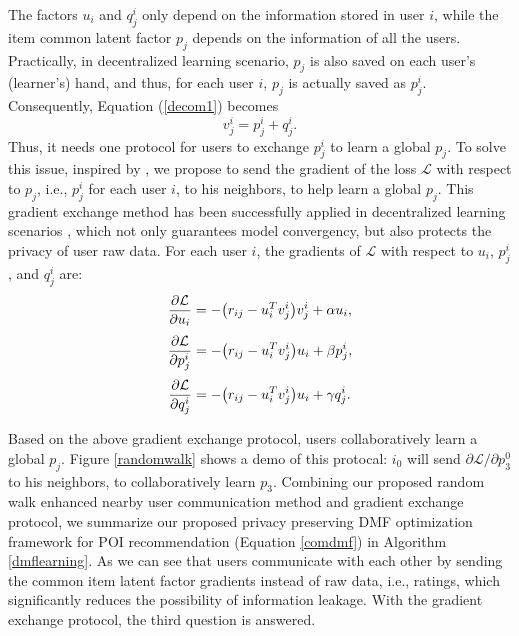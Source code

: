 The factors $u_i$ and $q^i_j$ only depend on the information stored in user $i$, while the item common latent factor $p_j$ depends on the information of all the users.
Practically, in decentralized learning scenario, $p_j$ is also saved on each user's (learner's) hand, and thus, for each user $i$, $p_j$ is actually saved as $p^i_j$. Consequently, Equation (\ref{decom1}) becomes 
\begin{equation}\label{decom2}
v^i_j=p^i_j+q^i_j.
\end{equation} 
Thus, it needs one protocol for users to exchange $p^i_j$ to learn a global $p_j$. 
To solve this issue, inspired by \cite{yan2013distributed}, we propose to send the gradient of the loss $\mathcal{L}$ with respect to $p_j$, i.e., $p^i_j$ for each user $i$, to his neighbors, to help learn a global $p_j$.  
This gradient exchange method has been successfully applied in decentralized learning scenarios \cite{nedic2009distributed,yan2013distributed}, which not only guarantees model convergency, but also protects the privacy of user raw data.  
For each user $i$, the gradients of $\mathcal{L}$ with respect to $u_i$, $p^i_j$, and $q^i_j$ are:
\begin{equation}\small
\label{usergradient}
\frac{\partial \mathcal{L}}{\partial u_i} = -{\left(r_{ij} - u_i^T v^i_j\right)}v^i_j + \alpha u_{i},
\end{equation} 
\begin{equation}\small
\label{commonitemgradient}
\frac{\partial \mathcal{L}}{\partial p^i_j} = -{\left(r_{ij} - u_i^T v^i_j\right)}u_i + \beta p^i_j,
\end{equation} 
\begin{equation}\small
\label{personalitemgradient}
\frac{\partial \mathcal{L}}{\partial q^i_j} = -{\left(r_{ij} - u_i^T v^i_j\right)}u_i + \gamma q^i_j.
\end{equation} 


Based on the above gradient exchange protocol, users collaboratively learn a global $p_j$. 
Figure \ref{randomwalk} shows a demo of this protocal: $i_0$ will send ${\partial \mathcal{L}}/{\partial p^0_3}$ to his neighbors, to collaboratively learn $p_3$. 
Combining our proposed random walk enhanced nearby user communication method and gradient exchange protocol, we summarize our proposed privacy preserving DMF optimization framework for POI recommendation (Equation \ref{comdmf}) in Algorithm \ref{dmflearning}. 
As we can see that users communicate with each other by sending the common item latent factor gradients instead of raw data, i.e., ratings, which significantly reduces the possibility of information leakage. 
With the gradient exchange protocol, the third question is answered. 


